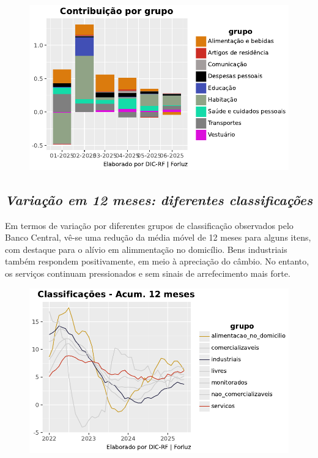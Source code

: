 \documentclass[
  letterpaper,
  DIV=11,
  numbers=noendperiod]{scrartcl}
\begin{document}
\begin{figure}

{\centering \includegraphics{Projeto IPCA Conjuntura_files/figure-pdf/cell-7-output-1.pdf}

}

\end{figure}

\hypertarget{variauxe7uxe3o-em-12-meses-diferentes-classificauxe7uxf5es}{%
\subsection{\texorpdfstring{\emph{Variação em 12 meses: diferentes
classificações}}{Variação em 12 meses: diferentes classificações}}\label{variauxe7uxe3o-em-12-meses-diferentes-classificauxe7uxf5es}}

Em termos de variação por diferentes grupos de classificação observados
pelo Banco Central, vê-se uma redução da média móvel de 12 meses para
alguns itens, com destaque para o alívio em alimmentação no domicílio.
Bens industriais também respondem positivamente, em meio à apreciação do
câmbio. No entanto, os serviços continuam pressionados e sem sinais de
arrefecimento mais forte.

\begin{figure}

{\centering \includegraphics{Projeto IPCA Conjuntura_files/figure-pdf/cell-8-output-1.pdf}

}

\end{figure}
\end{document}

